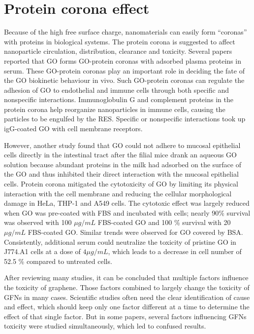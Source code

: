 \documentclass[twoside,twocolumn,9pt]{article}
\begin{document}
\section{Protein corona effect} Because of the high free surface charge, nanomaterials can easily form “coronas” with proteins in biological systems. The protein corona is suggested to affect nanoparticle circulation, distribution, clearance and toxicity. Several papers reported that GO forms GO-protein coronas with adsorbed plasma proteins in serum. These GO-protein coronas play an important role in deciding the fate of the GO biokinetic behaviour in vivo. Such GO-protein coronas can regulate the adhesion of GO to endothelial and immune cells through both specific and nonspecific interactions. Immunoglobulin G and complement proteins in the protein corona help reorganize nanoparticles in immune cells, causing the particles to be engulfed by the RES. Specific or nonspecific interactions took up igG-coated GO with cell membrane receptors.

However, another study found that GO could not adhere to mucosal epithelial cells directly in the intestinal tract after the filial mice drank an aqueous GO solution because abundant proteins in the milk had adsorbed on the surface of the GO and thus inhibited their direct interaction with the mucosal epithelial cells. Protein corona mitigated the cytotoxicity of GO by limiting its physical interaction with the cell membrane and reducing the cellular morphological damage in HeLa, THP-1 and A549 cells. The cytotoxic effect was largely reduced when GO was pre-coated with FBS and incubated with cells; nearly 90\% survival was observed with 100 $\mu g/mL$ FBS-coated GO and 100 \% survival with 20 $\mu g/mL$ FBS-coated GO. Similar trends were observed for GO covered by BSA. Consistently, additional serum could neutralize the toxicity of pristine GO in J774.A1 cells at a dose of $4 \mu g/mL$, which leads to a decrease in cell number of 52.5 \% compared to untreated cells.



After reviewing many studies, it can be concluded that multiple factors influence the toxicity of graphene. Those factors combined to largely change the toxicity of GFNs in many cases. Scientific studies often need the clear identification of cause and effect, which should keep only one factor different at a time to determine the effect of that single factor. But in some papers, several factors influencing GFNs toxicity were studied simultaneously, which led to confused results.
\end{document}
